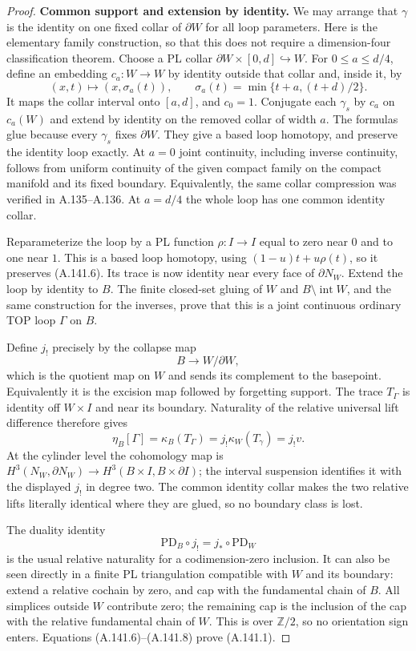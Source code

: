 \begin{proof}
\textbf{Common support and extension by identity.}
We may arrange that $\gamma$ is the identity on one
fixed collar of $\partial W$ for all loop parameters.
Here is the elementary family construction, so that this
does not require a dimension-four classification theorem.
Choose a PL collar $\partial W\times[0,d]\hookrightarrow W$.
For $0\le a\le d/4$, define an embedding $c_a:W\to W$
by identity outside that collar and, inside it, by
\[
 (x,t)\longmapsto(x,\sigma_a(t)),\qquad
 \sigma_a(t)=\min\{t+a,(t+d)/2\}.
\]
It maps the collar interval onto $[a,d]$, and $c_0=1$.
Conjugate each $\gamma_s$ by $c_a$ on $c_a(W)$ and
extend by identity on the removed collar of width $a$.
The formulas glue because every $\gamma_s$ fixes
$\partial W$. They give a based loop homotopy, and
preserve the identity loop exactly. At $a=0$ joint
continuity, including inverse continuity, follows from
uniform continuity of the given compact family on the
compact manifold and its fixed boundary. Equivalently,
the same collar compression was verified in A.135--A.136.
At $a=d/4$ the whole loop has one common identity collar.

Reparameterize the loop by a PL function $\rho:I\to I$
equal to zero near $0$ and to one near $1$. This is a
based loop homotopy, using
$(1-u)t+u\rho(t)$, so it preserves (A.141.6). Its trace is
now identity near every face of $\partial N_W$.
Extend the loop by identity to $B$. The finite closed-set
gluing of $W$ and $B\setminus\operatorname{int}W$, and
the same construction for the inverses, prove that this
is a joint continuous ordinary TOP loop $\Gamma$ on $B$.

Define $j_!$ precisely by the collapse map
\[
 B\longrightarrow W/\partial W,
\]
which is the quotient map on $W$ and sends its complement
to the basepoint. Equivalently it is the excision map
followed by forgetting support. The trace $T_\Gamma$
is identity off $W\times I$ and near its boundary.
Naturality of the relative universal lift difference
therefore gives
\[
          \eta_B[\Gamma]
          =\kappa_B(T_\Gamma)
          =j_!\kappa_W(T_\gamma)=j_!v.               \tag{A.141.7}
\]
At the cylinder level the cohomology map is
$H^3(N_W,\partial N_W)\to H^3(B\times I,B\times\partial I)$;
the interval suspension identifies it with the displayed
$j_!$ in degree two. The common identity collar makes
the two relative lifts literally identical where they
are glued, so no boundary class is lost.

The duality identity
\[
       \mathrm{PD}_B\circ j_!
                    =j_*\circ\mathrm{PD}_W           \tag{A.141.8}
\]
is the usual relative naturality for a codimension-zero
inclusion. It can also be seen directly in a finite PL
triangulation compatible with $W$ and its boundary:
extend a relative cochain by zero, and cap with the
fundamental chain of $B$. All simplices outside $W$
contribute zero; the remaining cap is the inclusion of
the cap with the relative fundamental chain of $W$.
This is over $\mathbb Z/2$, so no orientation sign enters.
Equations (A.141.6)--(A.141.8) prove (A.141.1).


\end{proof}
